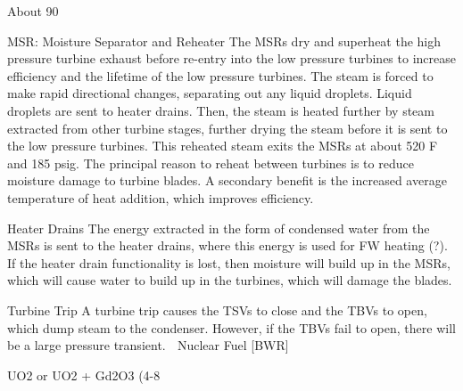 \documentclass[10pt]{article}
\begin{document}
About 90%

MSR: Moisture Separator and Reheater
The MSRs dry and superheat the high pressure turbine exhaust before re-entry into the low pressure turbines to increase efficiency and the lifetime of the low pressure turbines. The steam is forced to make rapid directional changes, separating out any liquid droplets. Liquid droplets are sent to heater drains. Then, the steam is heated further by steam extracted from other turbine stages, further drying the steam before it is sent to the low pressure turbines. This reheated steam exits the MSRs at about 520 F and 185 psig. The principal reason to reheat between turbines is to reduce moisture damage to turbine blades. A secondary benefit is the increased average temperature of heat addition, which improves efficiency. 

Heater Drains
The energy extracted in the form of condensed water from the MSRs is sent to the heater drains, where this energy is used for FW heating (?). If the heater drain functionality is lost, then moisture will build up in the MSRs, which will cause water to build up in the turbines, which will damage the blades. 

Turbine Trip
A turbine trip causes the TSVs to close and the TBVs to open, which dump steam to the condenser. However, if the TBVs fail to open, there will be a large pressure transient. 

Nuclear Fuel [BWR]

UO2 or UO2 + Gd2O3 (4-8%
\end{document}
